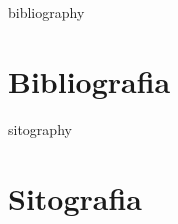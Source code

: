 \documentclass[a4paper, 12pt]{article} %
\begin{document}


\restoregeometry
\renewcommand\footnoterule{} %
\renewcommand*\contentsname{Indice} %
\newcommand{\defaultvspace}{\vspace{0.5cm}}


\newpage

\begingroup
    \linespread{0.63}
    \tableofcontents
\endgroup
\restoregeometry

\newpage \thispagestyle{plain} \mbox{}

\newpage


\newpage


\newpage


\newpage


\newpage


\newpage



\newpage


\begin{btSect}{bibliography}
\section*{Bibliografia}
\btPrintAll
\end{btSect}

\begin{btSect}{sitography}
\section*{Sitografia}
\btPrintAll
\end{btSect}

\newpage \thispagestyle{plain} \mbox{}
\newpage \thispagestyle{plain} \mbox{}
\newpage \thispagestyle{plain} \mbox{}

\end{document}
